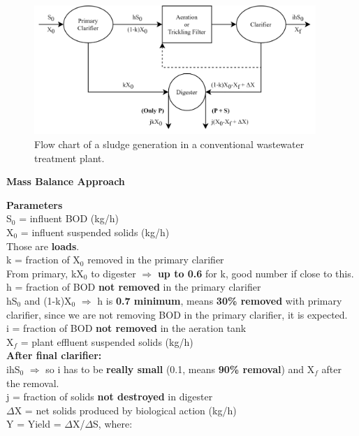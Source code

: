 \documentclass{article}
\numberwithin{equation}{section}
\begin{document}
\begin{figure}[htbp]
    \centering
    \includegraphics[width=0.95\textwidth]{SludgeQuantities.png}
    \caption{Flow chart of a sludge generation in a conventional wastewater treatment plant.}
    \label{fig:sludge}
\end{figure}
\begin{center}\textbf{\Large Mass Balance Approach}\end{center}
\textbf{\large Parameters}\\
S$_0$ = influent BOD (kg/h)\\
X$_0$ = influent suspended solids (kg/h)\\
Those are \textbf{loads}.\\
k = fraction of X$_0$ removed in the primary clarifier\\
From primary, kX$_0$ to digester $\Rightarrow$ \textbf{up to 0.6} for k, good number if close to this.\\
h = fraction of BOD \textbf{not removed} in the primary clarifier\\
hS$_0$ and (1-k)X$_0$ $\Rightarrow$ h is \textbf{0.7 minimum}, means \textbf{30\% removed} with primary clarifier, since we are not removing BOD in the primary clarifier, it is expected.\\
i = fraction of BOD \textbf{not removed} in the aeration tank\\
X$_f$ = plant effluent suspended solids (kg/h)\\
\textbf{After final clarifier:}\\
ihS$_0$ $\Rightarrow$ so i has to be \textbf{really small} (0.1, means \textbf{90\% removal}) and X$_f$ after the removal.\\
j = fraction of solids \textbf{not destroyed} in digester\\
$\Delta$X = net solids produced by biological action (kg/h)\\
Y = Yield = $\Delta$X/$\Delta$S, where:\\
\end{document}
